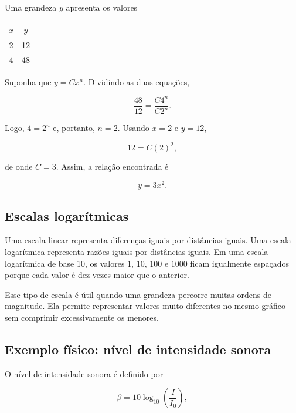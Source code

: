 Uma grandeza $y$ apresenta os valores

\begin{center}
\begin{tabular}{cc}
\toprule
$x$ & $y$\\
\midrule
2 & 12\\
4 & 48\\
\bottomrule
\end{tabular}
\end{center}

Suponha que $y=Cx^n$. Dividindo as duas equações,

\begin{equation}
  \frac{48}{12}=\frac{C4^n}{C2^n}.
\end{equation}

Logo, $4=2^n$ e, portanto, $n=2$. Usando $x=2$ e $y=12$,

\begin{equation}
  12=C(2)^2,
\end{equation}

de onde $C=3$. Assim, a relação encontrada é

\begin{equation}
  y=3x^2.
\end{equation}

\subsection{Escalas logarítmicas}

Uma escala linear representa diferenças iguais por distâncias iguais. Uma escala logarítmica representa razões iguais por distâncias iguais. Em uma escala logarítmica de base 10, os valores $1$, $10$, $100$ e $1000$ ficam igualmente espaçados porque cada valor é dez vezes maior que o anterior.

Esse tipo de escala é útil quando uma grandeza percorre muitas ordens de magnitude. Ela permite representar valores muito diferentes no mesmo gráfico sem comprimir excessivamente os menores.

\subsection*{Exemplo físico: nível de intensidade sonora}

O nível de intensidade sonora é definido por

\begin{equation}
  \beta=10\log_{10}\left(\frac{I}{I_0}\right),
\end{equation}

